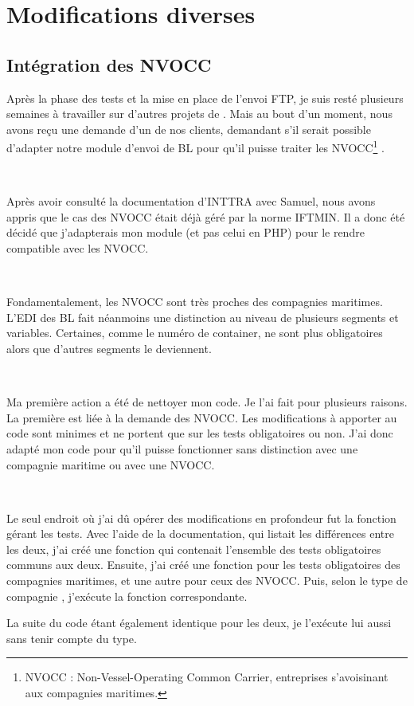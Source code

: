 \chapter{Modifications diverses}
\section{Intégration des NVOCC}
Après la phase des tests et la mise en place de l'envoi FTP, je suis resté plusieurs semaines à travailler sur d'autres projets de \solulog. Mais au bout d'un moment, nous avons reçu une demande d'un de nos clients, demandant s'il serait possible d'adapter notre module d'envoi de BL pour qu'il puisse traiter les \og NVOCC\footnote{NVOCC : Non-Vessel-Operating Common Carrier, entreprises s'avoisinant aux compagnies maritimes.} \fg.

~

Après avoir consulté la documentation d'INTTRA avec Samuel, nous avons appris que le cas des NVOCC était déjà géré par la norme IFTMIN. Il a donc été décidé que j'adapterais mon module (et pas celui en PHP) pour le rendre compatible avec les NVOCC.

~

Fondamentalement, les NVOCC sont très proches des compagnies maritimes. L'EDI des BL fait néanmoins une distinction au niveau de plusieurs segments et variables. Certaines, comme le numéro de container, ne sont plus obligatoires alors que d'autres segments le deviennent.

~

Ma première action a été de nettoyer mon code. Je l'ai fait pour plusieurs raisons. La première est liée à la demande des NVOCC. Les modifications à apporter au code sont minimes et ne portent que sur les tests obligatoires ou non. J'ai donc adapté mon code pour qu'il puisse fonctionner sans distinction avec une compagnie maritime ou avec une NVOCC.

~

Le seul endroit où j'ai dû opérer des modifications en profondeur fut la fonction gérant les tests. Avec l'aide de la documentation, qui listait les différences entre les deux, j'ai créé une fonction qui contenait l'ensemble des tests obligatoires communs aux deux. Ensuite, j'ai créé une fonction pour les tests obligatoires des compagnies maritimes, et une autre pour ceux des NVOCC. Puis, selon le type de \og compagnie \fg, j'exécute la fonction correspondante.

La suite du code étant également identique pour les deux, je l'exécute lui aussi sans tenir compte du type.


